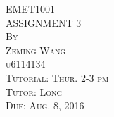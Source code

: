 \documentclass{article}
\begin{document}




\thispagestyle{empty}

\begin{center}
\huge
\vspace*{1.0in} EMET1001 
\\\vspace{0.5in} ASSIGNMENT 3
\normalsize
\\\vspace{0.5in} \textsc{By}
\\\vspace{0.1in} \textsc{Zeming Wang}
\\\vspace{0.1in} \textsc{u6114134}
\normalsize
\\\vspace{0.5in} \textsc{Tutorial: Thur. 2-3 pm}
\\\vspace{0.1in} \textsc{Tutor: Long}
\normalsize
\\\vspace{0.5in} \textsc{Due: Aug. 8, 2016}
\end{center}


\newpage
\setcounter{page}{1}
\end{document}
